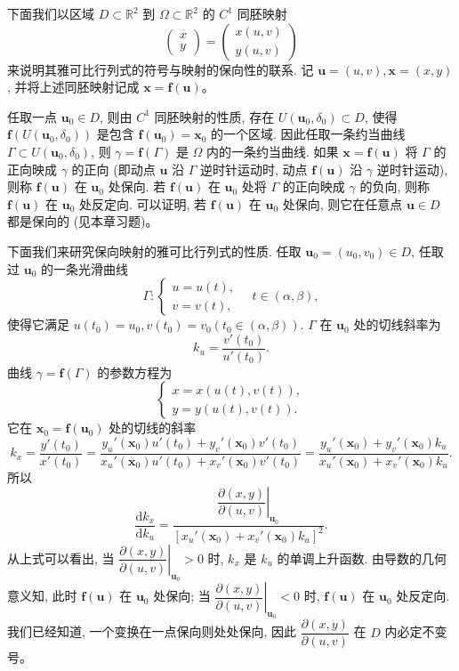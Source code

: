 \documentclass[UTF8,12pt,a4paper,fontset=fandol]{ctexart}
\begin{document}
下面我们以区域 $D\subset\mathbb R^2$ 到 $\Omega\subset\mathbb R^2$ 的 $C^1$ 同胚映射
\[
  \begin{pmatrix}x\\y\end{pmatrix}
  =
  \begin{pmatrix}x(u,v)\\y(u,v)\end{pmatrix}
\]
来说明其雅可比行列式的符号与映射的保向性的联系. 记 $\boldsymbol u=(u,v),\boldsymbol x=(x,y)$, 并将上述同胚映射记成 $\boldsymbol x=\boldsymbol f(\boldsymbol u)$。

任取一点 $\boldsymbol u_0\in D$, 则由 $C^1$ 同胚映射的性质, 存在 $U(\boldsymbol u_0,\delta_0)\subset D$, 使得 $\boldsymbol f(U(\boldsymbol u_0,\delta_0))$ 是包含 $\boldsymbol f(\boldsymbol u_0)=\boldsymbol x_0$ 的一个区域. 因此任取一条约当曲线 $\Gamma\subset U(\boldsymbol u_0,\delta_0)$, 则 $\gamma=\boldsymbol f(\Gamma)$ 是 $\Omega$ 内的一条约当曲线. 如果 $\boldsymbol x=\boldsymbol f(\boldsymbol u)$ 将 $\Gamma$ 的正向映成 $\gamma$ 的正向 (即动点 $\boldsymbol u$ 沿 $\Gamma$ 逆时针运动时, 动点 $\boldsymbol f(\boldsymbol u)$ 沿 $\gamma$ 逆时针运动), 则称 $\boldsymbol f(\boldsymbol u)$ 在 $\boldsymbol u_0$ 处保向. 若 $\boldsymbol f(\boldsymbol u)$ 在 $\boldsymbol u_0$ 处将 $\Gamma$ 的正向映成 $\gamma$ 的负向, 则称 $\boldsymbol f(\boldsymbol u)$ 在 $\boldsymbol u_0$ 处反定向. 可以证明, 若 $\boldsymbol f(\boldsymbol u)$ 在 $\boldsymbol u_0$ 处保向, 则它在任意点 $\boldsymbol u\in D$ 都是保向的 (见本章习题)。

下面我们来研究保向映射的雅可比行列式的性质. 任取 $\boldsymbol u_0=(u_0,v_0)\in D$, 任取过 $\boldsymbol u_0$ 的一条光滑曲线
\[
  \Gamma:\begin{cases}
    u=u(t),\\
    v=v(t),
  \end{cases}\quad t\in(\alpha,\beta),
\]
使得它满足 $u(t_0)=u_0,v(t_0)=v_0(t_0\in(\alpha,\beta))$. $\Gamma$ 在 $\boldsymbol u_0$ 处的切线斜率为
\[
  k_u=\frac{v'(t_0)}{u'(t_0)}.
\]
曲线 $\gamma=\boldsymbol f(\Gamma)$ 的参数方程为
\[
  \begin{cases}
    x=x(u(t),v(t)),\\
    y=y(u(t),v(t)).
  \end{cases}
\]
它在 $\boldsymbol x_0=\boldsymbol f(\boldsymbol u_0)$ 处的切线的斜率
\[
  k_x=\frac{y'(t_0)}{x'(t_0)}
  =\frac{y_u'(\boldsymbol x_0)u'(t_0)+y_v'(\boldsymbol x_0)v'(t_0)}
  {x_u'(\boldsymbol x_0)u'(t_0)+x_v'(\boldsymbol x_0)v'(t_0)}
  =\frac{y_u'(\boldsymbol x_0)+y_v'(\boldsymbol x_0)k_u}
  {x_u'(\boldsymbol x_0)+x_v'(\boldsymbol x_0)k_u}.
\]
所以
\[
  \frac{\mathrm dk_x}{\mathrm dk_u}
  =
  \frac{\left.\dfrac{\partial(x,y)}{\partial(u,v)}\right|_{\boldsymbol u_0}}
  {[x_u'(\boldsymbol x_0)+x_v'(\boldsymbol x_0)k_u]^2}.
\]
从上式可以看出, 当 $\left.\dfrac{\partial(x,y)}{\partial(u,v)}\right|_{\boldsymbol u_0}>0$ 时, $k_x$ 是 $k_u$ 的单调上升函数. 由导数的几何意义知, 此时 $\boldsymbol f(\boldsymbol u)$ 在 $\boldsymbol u_0$ 处保向; 当 $\left.\dfrac{\partial(x,y)}{\partial(u,v)}\right|_{\boldsymbol u_0}<0$ 时, $\boldsymbol f(\boldsymbol u)$ 在 $\boldsymbol u_0$ 处反定向. 我们已经知道, 一个变换在一点保向则处处保向, 因此 $\dfrac{\partial(x,y)}{\partial(u,v)}$ 在 $D$ 内必定不变号。
\end{document}
